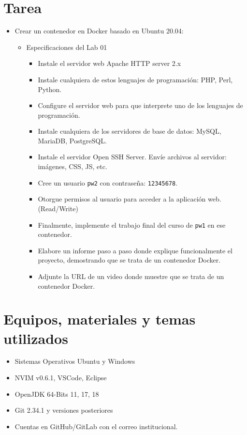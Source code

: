 \documentclass{article}
\begin{document}
	\section{Tarea}
	\begin{itemize}		%
		\item \textbf{}
Crear un contenedor en Docker basado en Ubuntu 20.04:
\begin{itemize}
    \item Especificaciones del Lab 01
    \begin{itemize}
        \item Instale el servidor web Apache HTTP server 2.x
        \item Instale cualquiera de estos lenguajes de programación: PHP, Perl, Python.
        \item Configure el servidor web para que interprete uno de los lenguajes de programación.
        \item Instale cualquiera de los servidores de base de datos: MySQL, MariaDB, PostgreSQL.
        \item Instale el servidor Open SSH Server. Envíe archivos al servidor: imágenes, CSS, JS, etc.
        \item Cree un usuario \texttt{pw2} con contraseña: \texttt{12345678}.
        \item Otorgue permisos al usuario para acceder a la aplicación web. (Read/Write)
        \item Finalmente, implemente el trabajo final del curso de \texttt{pw1} en ese contenedor.
        \item Elabore un informe paso a paso donde explique funcionalmente el proyecto, demostrando que se trata de un contenedor Docker.
        \item Adjunte la URL de un video donde muestre que se trata de un contenedor Docker.
    \end{itemize}
\end{itemize}
 

	\end{itemize}
		
	\section{Equipos, materiales y temas utilizados}
	\begin{itemize}
		\item Sistemas Operativos Ubuntu y Windows 
		\item NVIM v0.6.1, VSCode, Eclipse
		\item OpenJDK 64-Bits 11, 17, 18
		\item Git 2.34.1 y versiones posteriores
		\item Cuentas en GitHub/GitLab con el correo institucional.

	\end{itemize}
	
\end{document}
